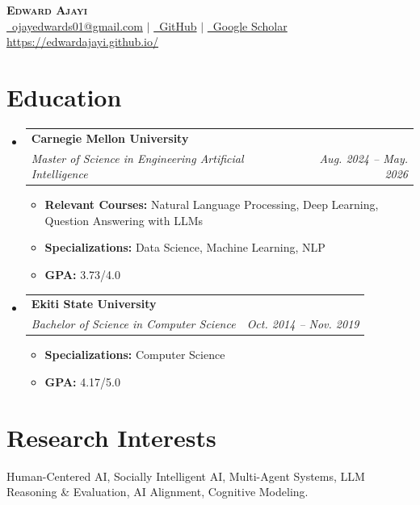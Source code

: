 \documentclass[letterpaper,10.99pt]{article}
\makeatletter
\newcommand{\resumeItem}[1]{
  \item\small{
    {#1 \vspace{-2pt}}
  }
}
\newcommand{\resumeSubheading}[4]{
  \vspace{0pt}\item
    \begin{tabular*}{0.97\textwidth}[t]{l@{\extracolsep{\fill}}r}
      \textbf{#1} & #2 \\
      \textit{\small#3} & \textit{\small #4} \\
    \end{tabular*}\vspace{-7pt}
}
\newcommand{\resumeSubHeadingListStart}{\begin{itemize}[leftmargin=0.15in, label={}]}
\newcommand{\resumeSubHeadingListEnd}{\end{itemize}}
\newcommand{\resumeItemListStart}{\begin{itemize}}
\newcommand{\resumeItemListEnd}{\end{itemize}\vspace{-5pt}}
\makeatother
\begin{document}
\begin{center}
    \textbf{\Huge \scshape Edward Ajayi} \\ \vspace{1pt}
    \small
    \href{mailto:ojayedwards01@gmail.com}{\faEnvelope\ ojayedwards01@gmail.com} $|$
    \href{https://github.com/edwardajayi}{\faGithub\ GitHub} $|$
    \href{https://scholar.google.com/citations?user=1TyN1RQAAAAJ&hl=en&inst=3203679203499159833}{\faGraduationCap\ Google Scholar}
    \\
    \href{https://edwardajayi.github.io/}{\underline{https://edwardajayi.github.io/}}
\end{center}

\section{Education}
  \resumeSubHeadingListStart
    \resumeSubheading
      {Carnegie Mellon University}{}
      {Master of Science in Engineering Artificial Intelligence}{Aug. 2024 -- May. 2026}
      \resumeItemListStart
        \resumeItem{\textbf{Relevant Courses:} Natural Language Processing, Deep Learning, Question Answering with LLMs}
        \resumeItem{\textbf{Specializations:} Data Science, Machine Learning, NLP}
        \resumeItem{\textbf{GPA:} 3.73/4.0}
      \resumeItemListEnd

    \resumeSubheading
      {Ekiti State University}{}
      {Bachelor of Science in Computer Science}{Oct. 2014 -- Nov. 2019}
      \resumeItemListStart
        \resumeItem{\textbf{Specializations:} Computer Science}
        \resumeItem{\textbf{GPA:} 4.17/5.0}
      \resumeItemListEnd
  \resumeSubHeadingListEnd


\section{Research Interests}
\small{Human-Centered AI, Socially Intelligent AI, Multi-Agent Systems, LLM Reasoning \& Evaluation, AI Alignment, Cognitive Modeling.}
\vspace{-8pt}
\end{document}
